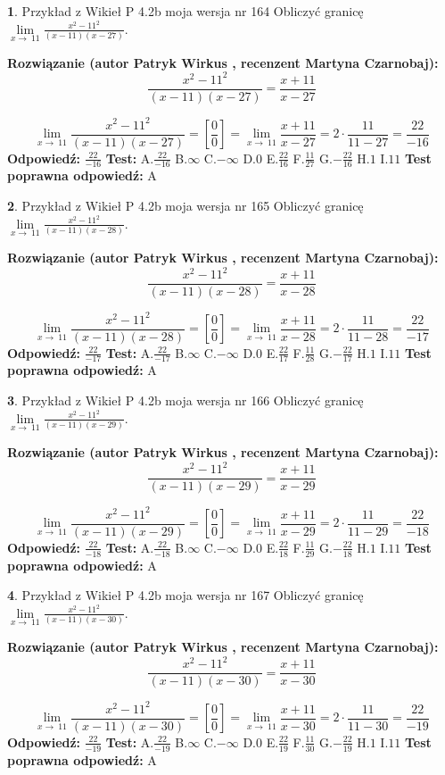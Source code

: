 \documentclass[12pt, a4paper]{article}
\theoremstyle{definition} %
\newtheorem{zad}{}
\newcommand{\zadStart}[1]{\begin{zad}#1\newline}
\newcommand{\zadStop}{\end{zad}}
\newcommand{\rozwStart}[2]{\noindent \textbf{Rozwiązanie (autor #1 , recenzent #2): }\newline}
\newcommand{\rozwStop}{\newline}
\newcommand{\odpStart}{\noindent \textbf{Odpowiedź:}\newline}
\newcommand{\odpStop}{\newline}
\newcommand{\testStart}{\noindent \textbf{Test:}\newline}
\newcommand{\testStop}{\newline}
\newcommand{\kluczStart}{\noindent \textbf{Test poprawna odpowiedź:}\newline}
\newcommand{\kluczStop}{\newline}
\begin{document}
\zadStart{Przykład z Wikieł P 4.2b moja wersja nr 164}
Obliczyć granicę $\lim\limits_{x\to\ 11}\frac{x^{2}-11^{2}}{(x-11)(x-27)}$.
\zadStop
\rozwStart{Patryk Wirkus}{Martyna Czarnobaj}
$$\frac{x^{2}-11^{2}}{(x-11)(x-27)}=\frac{x+11}{x-27}$$

$$\lim\limits_{x\to\ 11}\frac{x^{2}-11^{2}}{(x-11)(x-27)}=[\frac{0}{0}]=\lim\limits_{x\to\ 11}\frac{x+11}{x-27}=2 \cdot \frac{11}{11-27} = \frac{22}{-16}$$
\rozwStop
\odpStart
$\frac{22}{-16}$
\odpStop
\testStart
A.$\frac{22}{-16}$
B.$\infty$
C.$-\infty$
D.$0$
E.$\frac{22}{16}$
F.$\frac{11}{27}$
G.$-\frac{22}{16}$
H.$1$
I.$11$
\testStop
\kluczStart
A
\kluczStop



\zadStart{Przykład z Wikieł P 4.2b moja wersja nr 165}
Obliczyć granicę $\lim\limits_{x\to\ 11}\frac{x^{2}-11^{2}}{(x-11)(x-28)}$.
\zadStop
\rozwStart{Patryk Wirkus}{Martyna Czarnobaj}
$$\frac{x^{2}-11^{2}}{(x-11)(x-28)}=\frac{x+11}{x-28}$$

$$\lim\limits_{x\to\ 11}\frac{x^{2}-11^{2}}{(x-11)(x-28)}=[\frac{0}{0}]=\lim\limits_{x\to\ 11}\frac{x+11}{x-28}=2 \cdot \frac{11}{11-28} = \frac{22}{-17}$$
\rozwStop
\odpStart
$\frac{22}{-17}$
\odpStop
\testStart
A.$\frac{22}{-17}$
B.$\infty$
C.$-\infty$
D.$0$
E.$\frac{22}{17}$
F.$\frac{11}{28}$
G.$-\frac{22}{17}$
H.$1$
I.$11$
\testStop
\kluczStart
A
\kluczStop



\zadStart{Przykład z Wikieł P 4.2b moja wersja nr 166}
Obliczyć granicę $\lim\limits_{x\to\ 11}\frac{x^{2}-11^{2}}{(x-11)(x-29)}$.
\zadStop
\rozwStart{Patryk Wirkus}{Martyna Czarnobaj}
$$\frac{x^{2}-11^{2}}{(x-11)(x-29)}=\frac{x+11}{x-29}$$

$$\lim\limits_{x\to\ 11}\frac{x^{2}-11^{2}}{(x-11)(x-29)}=[\frac{0}{0}]=\lim\limits_{x\to\ 11}\frac{x+11}{x-29}=2 \cdot \frac{11}{11-29} = \frac{22}{-18}$$
\rozwStop
\odpStart
$\frac{22}{-18}$
\odpStop
\testStart
A.$\frac{22}{-18}$
B.$\infty$
C.$-\infty$
D.$0$
E.$\frac{22}{18}$
F.$\frac{11}{29}$
G.$-\frac{22}{18}$
H.$1$
I.$11$
\testStop
\kluczStart
A
\kluczStop



\zadStart{Przykład z Wikieł P 4.2b moja wersja nr 167}
Obliczyć granicę $\lim\limits_{x\to\ 11}\frac{x^{2}-11^{2}}{(x-11)(x-30)}$.
\zadStop
\rozwStart{Patryk Wirkus}{Martyna Czarnobaj}
$$\frac{x^{2}-11^{2}}{(x-11)(x-30)}=\frac{x+11}{x-30}$$

$$\lim\limits_{x\to\ 11}\frac{x^{2}-11^{2}}{(x-11)(x-30)}=[\frac{0}{0}]=\lim\limits_{x\to\ 11}\frac{x+11}{x-30}=2 \cdot \frac{11}{11-30} = \frac{22}{-19}$$
\rozwStop
\odpStart
$\frac{22}{-19}$
\odpStop
\testStart
A.$\frac{22}{-19}$
B.$\infty$
C.$-\infty$
D.$0$
E.$\frac{22}{19}$
F.$\frac{11}{30}$
G.$-\frac{22}{19}$
H.$1$
I.$11$
\testStop
\kluczStart
A
\kluczStop
\end{document}
